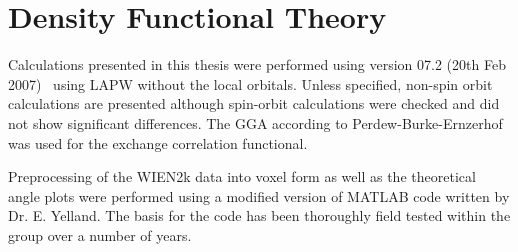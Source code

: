 
\section{Density Functional Theory}
\label{Sec:Exp:Dft}

Calculations presented in this thesis were performed using \WIEN version 07.2 (20th Feb 2007)~\cite{Blaha2001} using \ac{LAPW} without the local orbitals. Unless specified, non-spin orbit calculations are presented although spin-orbit calculations were checked and did not show significant differences. The \ac{GGA} according to Perdew-Burke-Ernzerhof~\cite{Perdew1996} was used for the exchange correlation functional.

Preprocessing of the WIEN2k data into voxel form as well as the theoretical angle plots were performed using a modified version of MATLAB code written by Dr. E. Yelland. The basis for the code has been thoroughly field tested within the group over a number of years.
